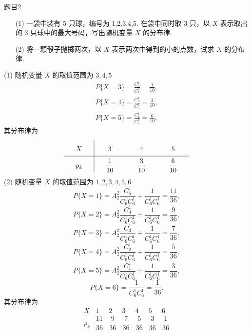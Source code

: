 \begin{question}{题目2}
    \begin{itemize}
        \item [(1)] 一袋中装有 5 只球，编号为 1,2,3,4,5. 在袋中同时取 3 只，以 $X$ 表示取出的 3 只球中的最大号码，写出随机变量 $X$ 的分布律.
        \item [(2)] 将一颗骰子抛掷两次，以 $X$ 表示两次中得到的小的点数，试求 $X$ 的分布律.
    \end{itemize}
\end{question}
\begin{solution}
    (1) 随机变量 $X$ 的取值范围为 $3, 4, 5$
    $$
        \begin{aligned}
            P\{X = 3\} = \frac{C_2^2}{C_5^3} = \frac{1}{10}, \\
            P\{X = 4\} = \frac{C_3^2}{C_5^3} = \frac{3}{10}, \\
            P\{X = 5\} = \frac{C_4^2}{C_5^3} = \frac{6}{10}.
        \end{aligned}
    $$
    其分布律为
    $$
        \renewcommand\arraystretch{2}
        \setlength{\arraycolsep}{6mm}
        \begin{array}{c|ccc}
            X   & 3             & 4             & 5             \\
            \hline
            p_k & \dfrac{1}{10} & \dfrac{3}{10} & \dfrac{6}{10}
        \end{array}
    $$
    (2) 随机变量 $X$ 的取值范围为 $1, 2, 3, 4, 5, 6$
    $$
        P\{X=1\} = A_2^2\frac{C_5^1}{C_6^1C_6^1} + \frac{1}{C_6^1C_6^1} = \frac{11}{36},
    $$
    $$
        P\{X=2\} = A_2^2\frac{C_4^1}{C_6^1C_6^1} + \frac{1}{C_6^1C_6^1} = \frac{9}{36},
    $$
    $$
        P\{X=3\} = A_2^2\frac{C_3^1}{C_6^1C_6^1} + \frac{1}{C_6^1C_6^1} = \frac{7}{36},
    $$
    $$
        P\{X=4\} = A_2^2\frac{C_2^1}{C_6^1C_6^1} + \frac{1}{C_6^1C_6^1} = \frac{5}{36},
    $$
    $$
        P\{X=5\} = A_2^2\frac{C_1^1}{C_6^1C_6^1} + \frac{1}{C_6^1C_6^1} = \frac{3}{36},
    $$
    $$
        P\{X=6\} = \frac{1}{C_6^1C_6^1} = \frac{1}{36}.
    $$
    其分布律为
    $$
        \renewcommand\arraystretch{2}
        \begin{array}{c|cccccc}
            X   & 1              & 2             & 3             & 4             & 5             & 6             \\
            \hline
            p_k & \dfrac{11}{36} & \dfrac{9}{36} & \dfrac{7}{36} & \dfrac{5}{36} & \dfrac{3}{36} & \dfrac{1}{36} \\
        \end{array}
    $$
\end{solution}

